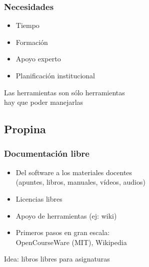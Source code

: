 \documentclass[17pt,aspectratio=169]{beamer}
\renewcommand{\secimage}{figs/bookpages}
\newcommand{\secimage}{figs/bookpages}
\begin{document}

\begin{frame}
\frametitle{Necesidades}

\begin{itemize}
\item Tiempo
\item Formación
\item Apoyo experto
\item Planificación institucional
\end{itemize}

\begin{flushright}
  Las herramientas son sólo herramientas \\
  hay que poder manejarlas \\
\end{flushright}
\end{frame}


\renewcommand{\secimage}{figs/tipjar}
{\bf
  \textcolor[rgb]{1,1,1}{
    \section{Propina}
  }
}


\begin{frame}
\frametitle{Documentación libre}

\begin{itemize}
\item Del software a los materiales docentes \\
  (apuntes, libros, manuales, vídeos, audios)
\item Licencias libres
\item Apoyo de herramientas (ej: wiki)
\item Primeros pasos en gran escala: \\
  OpenCourseWare (MIT), Wikipedia
\end{itemize}

{\Large
\begin{center}
Idea: libros libres para asignaturas
\end{center}
}

\end{frame}
\end{document}
